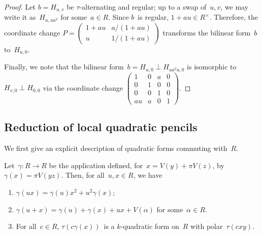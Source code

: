 \documentclass{article}%
\def\mat#1{\begin{pmatrix}#1\end{pmatrix}}
\begin{document}
\begin{proof}
Let $b = H_{u,v}$ be $τ$-alternating and regular; up to a swap of~$u, v$, we
may write it as~$H_{u, u a^2}$ for some~$a ∈ R$. Since $b$~is
regular, $1 + a u ∈ R^{×}$. Therefore, the coordinate
change $P = \mat{1+a u & a/(1+a u) \\ u & 1/(1+a u)}$ transforms the
bilinear form~$b$ to~$H_{u, 0}$.

Finally, we note that the bilinear form~$b = H_{u, 0} ⟂ H_{u a^2 u, 0}$ is
isomorphic to~$H_{v, 0} ⟂ H_{0,0}$ via the coordinate change
$\mat{1 & 0 & a & 0\\0&1&0&0\\0&0&1&0\\au & a & 0 & 1}$.
\end{proof}%

\subsection{Reduction of local quadratic pencils}%

We first give an explicit description of quadratic forms commuting
with~$R$.

\begin{lem}\label{lem:gamma-polar}%
Let~$γ: R → R$ be the application defined, for~$x = V(y) + π V(z)$,
by~$γ(x) = π V(yz)$. Then, for all~$u, x ∈ R$, we have
\begin{enumerate}
\item $γ(ux) = γ(u) x^2 + u^2 γ(x)$;
\item $γ(u+x) = γ(u) + γ(x) + ux + V(α)$ for some~$α ∈ R$.
\item For all~$c ∈ R$, $τ(c γ (x))$~is a $k$-quadratic form on~$R$
with polar~$τ(c x y)$.
\end{enumerate}
\end{lem}
\end{document}
